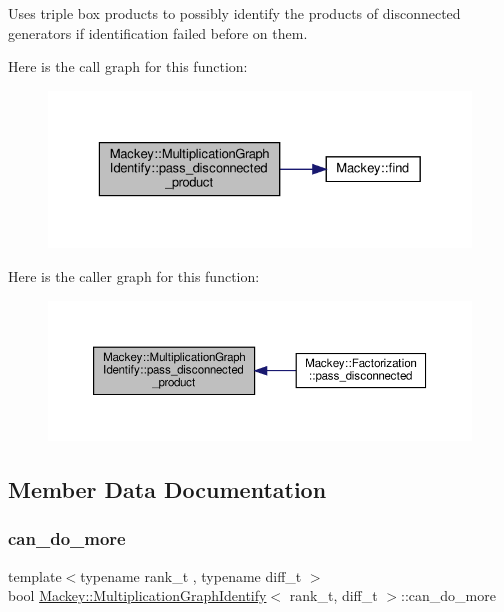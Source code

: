Uses triple box products to possibly identify the products of disconnected generators if identification failed before on them. 

Here is the call graph for this function\+:\nopagebreak
\begin{figure}[H]
\begin{center}
\leavevmode
\includegraphics[width=329pt]{classMackey_1_1MultiplicationGraphIdentify_a110991be3ba595dbf401ef4a769e4dec_cgraph}
\end{center}
\end{figure}
Here is the caller graph for this function\+:\nopagebreak
\begin{figure}[H]
\begin{center}
\leavevmode
\includegraphics[width=350pt]{classMackey_1_1MultiplicationGraphIdentify_a110991be3ba595dbf401ef4a769e4dec_icgraph}
\end{center}
\end{figure}


\subsection{Member Data Documentation}
\mbox{\label{classMackey_1_1MultiplicationGraphIdentify_a8356b59250ebac1ac30ebc7407bd352b}} 
\subsubsection{\texorpdfstring{can\+\_\+do\+\_\+more}{can\_do\_more}}
{\footnotesize\ttfamily template$<$typename rank\+\_\+t , typename diff\+\_\+t $>$ \\
bool \hyperlink{classMackey_1_1MultiplicationGraphIdentify}{Mackey\+::\+Multiplication\+Graph\+Identify}$<$ rank\+\_\+t, diff\+\_\+t $>$\+::can\+\_\+do\+\_\+more\hspace{0.3cm}{\ttfamily [protected]}}



